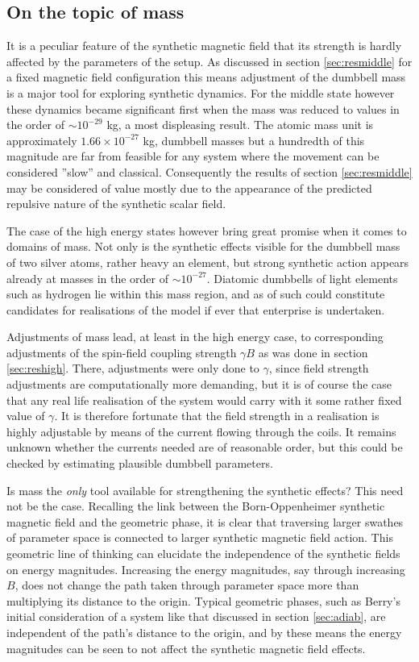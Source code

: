 \documentclass[main.tex]{subfiles}
\begin{document}
\subsection{On the topic of mass}
It is a peculiar feature of the synthetic magnetic field that its strength is hardly
affected by the parameters of the setup. As discussed in section \ref{sec:resmiddle} for a
fixed magnetic field configuration this means adjustment of the dumbbell mass is a major
tool for exploring synthetic dynamics. For the middle state however these dynamics became
significant first when the mass was reduced to values in the order of \(\sim 10^{-29}\) kg, a
most displeasing result. The atomic mass unit is approximately \(1.66\times 10^{-27}\) kg, 
dumbbell masses but a hundredth of this magnitude are far from feasible for any system
where the movement can be considered ''slow'' and classical. Consequently the results
of section \ref{sec:resmiddle} may be considered of value mostly due to the appearance of the
predicted repulsive nature of the synthetic scalar field.

The case of the high energy states however bring great promise when it comes to domains of
mass. Not only is the synthetic effects visible for the dumbbell mass of two silver atoms,
rather heavy an element, but strong synthetic action appears already at masses in the order
of \(\sim 10^{-27}\). Diatomic dumbbells of light elements such as hydrogen lie within this
mass region, and as of such could constitute candidates for realisations of the model if
ever that enterprise is undertaken.

Adjustments of mass lead, at least in the high energy case, to corresponding adjustments of
the spin-field coupling strength \(\gamma B\) as was done in section  \ref{sec:reshigh}.
There, adjustments were only done to \(\gamma\), since field strength adjustments are
computationally more demanding, but it is of course the case that any real life realisation
of the system would carry with it some rather fixed value of \(\gamma\). It is therefore
fortunate that the field strength in a realisation is highly adjustable by means of the
current flowing through the coils. It remains unknown whether the currents needed are of
reasonable order, but this could be checked by estimating plausible dumbbell
parameters.

Is mass the \textit{only} tool available for strengthening the synthetic effects? This
need not be the case. Recalling the link between the Born-Oppenheimer synthetic magnetic
field and the geometric phase, it is clear that traversing larger swathes of
parameter space is connected to larger synthetic magnetic field action. This geometric line
of thinking can elucidate the independence of the synthetic fields on energy magnitudes.
Increasing the energy magnitudes, say through increasing \(B\), does not change the
path taken through parameter space more than multiplying its distance to the origin.
Typical geometric phases, such as Berry's initial consideration of a system like that
discussed in
section \ref{sec:adiab}, are independent of the path's distance to the origin, and by these
means the energy magnitudes can be seen to not affect the synthetic magnetic field effects.
\end{document}
